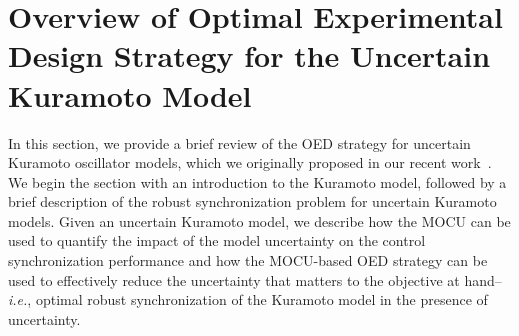 \documentclass{article}
\begin{document}

\section{Overview of Optimal Experimental Design Strategy for the Uncertain Kuramoto Model}
\label{sec:KM}
In this section, we provide a brief review of the OED strategy for uncertain Kuramoto oscillator models, which we originally proposed in our recent work~\cite{Hong2021}. We begin the section with an introduction to the Kuramoto model, followed by a brief description of the robust synchronization problem for uncertain Kuramoto models. Given an uncertain Kuramoto model, we describe how the MOCU can be used to quantify the impact of the model uncertainty on the control synchronization performance and how the MOCU-based OED strategy can be used to effectively reduce the uncertainty that matters to the objective at hand--\textit{i.e.}, optimal robust synchronization of the Kuramoto model in the presence of uncertainty.
\end{document}
